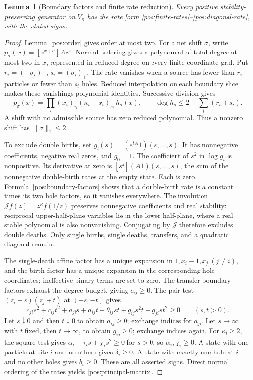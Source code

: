 \documentclass[reqno]{amsart}
\newtheorem{lemma}[theorem]{Lemma}
\theoremstyle{definition}
\theoremstyle{remark}
\begin{document}
\begin{lemma}[Boundary factors and finite rate reduction]\label{pos:finite-structure}
Every positive stability-preserving generator on \(V_\kappa\) has the rate form
\eqref{pos:finite-rates}--\eqref{pos:diagonal-rate}, with the stated signs.
\end{lemma}
\begin{proof}
Lemma~\ref{pos:order} gives order at most two.  For a net shift \(\sigma\), write
\(p_\sigma(x)=[z^{x+\sigma}]Az^x\).  Normal ordering gives a polynomial of total
degree at most two in \(x\), represented in reduced degree on every finite
coordinate grid.  Put \(r_i=(-\sigma_i)_+\), \(s_i=(\sigma_i)_+\).  The rate
vanishes when a source has fewer than \(r_i\) particles or fewer than \(s_i\)
holes.  Reduced interpolation on each boundary slice makes these vanishings
polynomial identities.  Successive division gives
\begin{equation}\label{pos:boundary-factors}
 p_\sigma(x)=\prod_i(x_i)_{r_i}(\kappa_i-x_i)_{s_i}\,h_\sigma(x),
 \qquad\deg h_\sigma\le2-\sum_i(r_i+s_i).
\end{equation}
A shift with no admissible source has zero reduced polynomial.  Thus a nonzero
shift has \(\|\sigma\|_1\le2\).

To exclude double births, set \(g_t(s)=(e^{tA}1)(s,\ldots,s)\).
It has nonnegative coefficients, negative real zeros, and \(g_0=1\).
The coefficient of \(s^2\) in \(\log g_t\) is nonpositive.  Its derivative at
zero is \([s^2](A1)(s,\ldots,s)\), the sum of the nonnegative double-birth
rates at the empty state.  Each is zero.  Formula~\eqref{pos:boundary-factors}
shows that a double-birth rate is a constant times its two hole factors, so
it vanishes everywhere.  The involution
\(\mathcal Jf(z)=z^\kappa f(1/z)\) preserves nonnegative coefficients and real
stability: reciprocal upper-half-plane variables lie in the lower half-plane,
where a real stable polynomial is also nonvanishing.  Conjugating by \(\mathcal J\)
therefore excludes double deaths.  Only single births, single deaths, transfers,
and a quadratic diagonal remain.

The single-death affine factor has a unique expansion in
\(1,x_i-1,x_j\ (j\ne i)\), and the birth factor has a unique expansion in the
corresponding hole coordinates; ineffective binary terms are set to zero.
The transfer boundary factors exhaust the degree budget, giving \(c_{ij}\ge0\).
The pair test \((z_i+s)(z_j+t)\) at \((-s,-t)\) gives
\[
 c_{ji}s^2+c_{ij}t^2+a_{ji}s+a_{ij}t-\theta_{ij}st
 +g_{ij}s^2t+g_{ji}st^2\ge0\qquad(s,t>0).
\]
Let \(s\downarrow0\) and then \(t\downarrow0\) to obtain \(a_{ij}\ge0\);
exchange indices for \(a_{ji}\).  Let \(s\to\infty\) with \(t\) fixed, then
\(t\to\infty\), to obtain \(g_{ij}\ge0\); exchange indices again.
For \(\kappa_i\ge2\), the square test gives
\(\alpha_i-\tau_i s+\chi_i s^2\ge0\) for \(s>0\), so
\(\alpha_i,\chi_i\ge0\).
A state with one particle at site \(i\) and no others gives \(\delta_i\ge0\).
A state with exactly one hole at \(i\) and no other holes gives \(b_i\ge0\).
These are all asserted signs.  Direct normal ordering of the rates yields
\eqref{pos:principal-matrix}.
\end{proof}
\end{document}
